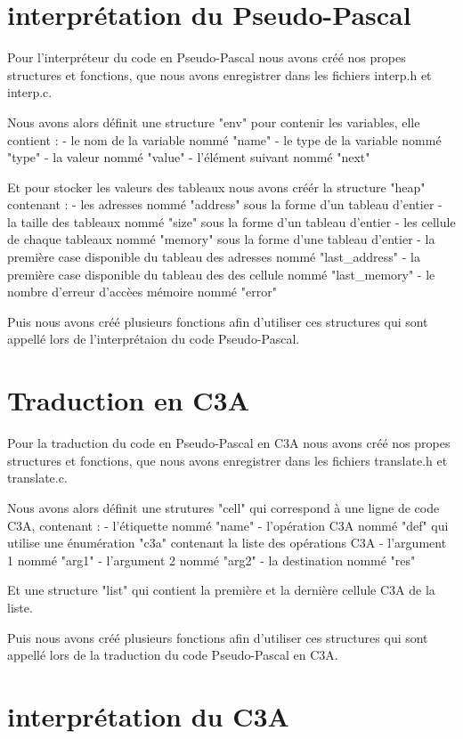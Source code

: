 ﻿\documentclass{report}
\begin{document}
\section{interprétation du Pseudo-Pascal}
Pour l'interpréteur du code en Pseudo-Pascal nous avons créé nos propes structures et fonctions, que nous avons enregistrer dans les fichiers interp.h et interp.c.

Nous avons alors définit une structure "env" pour contenir les variables, elle contient :
	- le nom de la variable nommé "name"
	- le type de la variable nommé "type"
	- la valeur nommé "value"
	- l'élément suivant nommé "next"
	
Et pour stocker les valeurs des tableaux nous avons créér la structure "heap" contenant :
	- les adresses nommé "address" sous la forme d'un tableau d'entier
	- la taille des tableaux nommé "size" sous la forme d'un tableau d'entier
	- les cellule de chaque tableaux nommé "memory" sous la forme d'une tableau d'entier
	- la première case disponible du tableau des adresses nommé "last_address"
	- la première case disponible du tableau des des cellule nommé "last_memory"
	- le nombre d'erreur d'accèes mémoire nommé "error"
	
Puis nous avons créé plusieurs fonctions afin d'utiliser ces structures qui sont appellé lors de l'interprétaion du code Pseudo-Pascal.

\section{Traduction en C3A}
Pour la traduction du code en Pseudo-Pascal en C3A nous avons créé nos propes structures et fonctions, que nous avons enregistrer dans les fichiers translate.h et translate.c.

Nous avons alors définit une strutures "cell" qui correspond à une ligne de code C3A, contenant :
	- l'étiquette nommé "name"
	- l'opération C3A nommé "def" qui utilise une énumération "c3a" contenant la liste des opérations C3A
	- l'argument 1 nommé "arg1"
	- l'argument 2 nommé "arg2"
	- la destination nommé "res"
	
Et une structure "list" qui contient la première et la dernière cellule C3A de la liste.

Puis nous avons créé plusieurs fonctions afin d'utiliser ces structures qui sont appellé lors de la traduction du code Pseudo-Pascal en C3A.

\section{interprétation du C3A}
\end{document}
